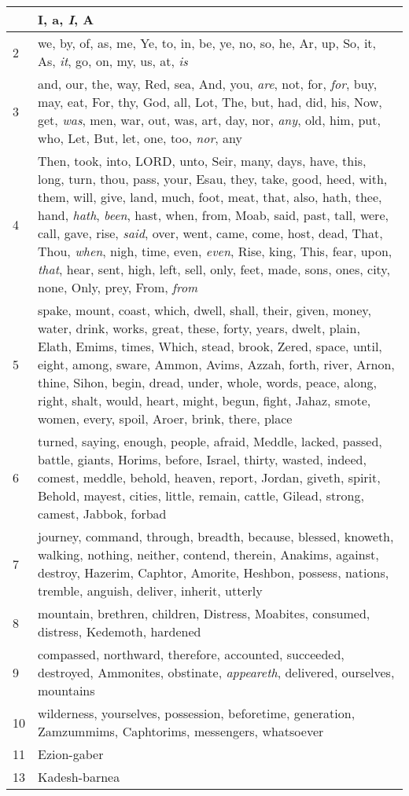 \begin{longtable}{l|p{3.75in}}
\hline \hline
\endlastfoot
1 & I, a, \emph{I}, A \\ \hline
2 & we, by, of, as, me, Ye, to, in, be, ye, no, so, he, Ar, up, So, it, As, \emph{it}, go, on, my, us, at, \emph{is} \\ \hline
3 & and, our, the, way, Red, sea, And, you, \emph{are}, not, for, \emph{for}, buy, may, eat, For, thy, God, all, Lot, The, but, had, did, his, Now, get, \emph{was}, men, war, out, was, art, day, nor, \emph{any}, old, him, put, who, Let, But, let, one, too, \emph{nor}, any \\ \hline
4 & Then, took, into, LORD, unto, Seir, many, days, have, this, long, turn, thou, pass, your, Esau, they, take, good, heed, with, them, will, give, land, much, foot, meat, that, also, hath, thee, hand, \emph{hath}, \emph{been}, hast, when, from, Moab, said, past, tall, were, call, gave, rise, \emph{said}, over, went, came, come, host, dead, That, Thou, \emph{when}, nigh, time, even, \emph{even}, Rise, king, This, fear, upon, \emph{that}, hear, sent, high, left, sell, only, feet, made, sons, ones, city, none, Only, prey, From, \emph{from} \\ \hline
5 & spake, mount, coast, which, dwell, shall, their, given, money, water, drink, works, great, these, forty, years, dwelt, plain, Elath, Emims, times, Which, stead, brook, Zered, space, until, eight, among, sware, Ammon, Avims, Azzah, forth, river, Arnon, thine, Sihon, begin, dread, under, whole, words, peace, along, right, shalt, would, heart, might, begun, fight, Jahaz, smote, women, every, spoil, Aroer, brink, there, place \\ \hline
6 & turned, saying, enough, people, afraid, Meddle, lacked, passed, battle, giants, Horims, before, Israel, thirty, wasted, indeed, comest, meddle, behold, heaven, report, Jordan, giveth, spirit, Behold, mayest, cities, little, remain, cattle, Gilead, strong, camest, Jabbok, forbad \\ \hline
7 & journey, command, through, breadth, because, blessed, knoweth, walking, nothing, neither, contend, therein, Anakims, against, destroy, Hazerim, Caphtor, Amorite, Heshbon, possess, nations, tremble, anguish, deliver, inherit, utterly \\ \hline
8 & mountain, brethren, children, Distress, Moabites, consumed, distress, Kedemoth, hardened \\ \hline
9 & compassed, northward, therefore, accounted, succeeded, destroyed, Ammonites, obstinate, \emph{appeareth}, delivered, ourselves, mountains \\ \hline
10 & wilderness, yourselves, possession, beforetime, generation, Zamzummims, Caphtorims, messengers, whatsoever \\ \hline
11 & Ezion-gaber \\ \hline
13 & Kadesh-barnea \\ \hline
\end{longtable}






